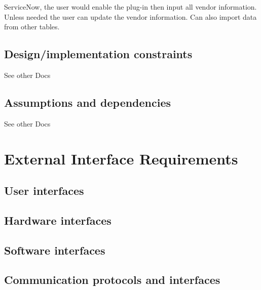 \documentclass[10pt]{article}
\begin{document}
ServiceNow, the user would enable the plug-in then input all vendor information. Unless needed the user can update the vendor information. Can also import data from other tables. 

\subsection{Design/implementation constraints}

See other Docs

\subsection{Assumptions and dependencies}

See other Docs








\section{External Interface Requirements} 

\subsection{User interfaces}

\lipsum[10]

\subsection{Hardware interfaces}

\lipsum[10]

\subsection{Software interfaces}

\lipsum[10]

\subsection{Communication protocols and interfaces}

\lipsum[10]
\end{document}
